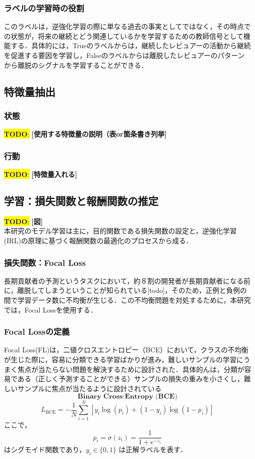 \documentclass[submit,techrep,noauthor]{ipsj}
\newcommand{\todo}[1]{\colorbox{yellow}{{\bf TODO}:}{\color{red} {\textbf{[#1]}}}}
\begin{document}
\subsubsection{ラベルの学習時の役割}
このラベルは，逆強化学習の際に単なる過去の事実としてではなく，その時点での状態が，将来の継続とどう関連しているかを学習するための教師信号として機能する．具体的には，Trueのラベルからは，継続したレビュアーの活動から継続を促進する要因を学習し，Falseのラベルからは離脱したレビュアーのパターンから離脱のシグナルを学習することができる．

\subsection{特徴量抽出}
\subsubsection{状態}
\todo{使用する特徴量の説明（表or箇条書き列挙}
\subsubsection{行動}
\todo{特徴量入れる}

\subsection{学習：損失関数と報酬関数の推定}
\todo{図} \\
本研究のモデル学習は主に，目的関数である損失関数の設定と，逆強化学習(IRL)の原理に基づく報酬関数の最適化のプロセスから成る．
\subsubsection{損失関数：Focal Loss}
長期貢献者の予測というタスクにおいて，約８割の開発者が長期貢献者になる前に，離脱してしまうということが知られている[todo]，そのため，正例と負例の間で学習データ数に不均衡が生じる．この不均衡問題を対処するために，本研究では，Focal Lossを使用する．
\subsubsection{Focal Lossの定義}
Focal Loss(FL)は，二値クロスエントロピー（BCE）において，クラスの不均衡が生じた際に，容易に分類できる学習ばかりが進み，難しいサンプルの学習にうまく焦点が当たらない問題を解決するために設計された．具体的んは，分類が容易である（正しく予測することができる）サンプルの損失の重みを小さくし，難しいサンプルに焦点が当たるように設計されている
\[\textbf{Binary Cross-Entropy (BCE)}\]
\[
L_{\mathrm{BCE}} = - \frac{1}{N} \sum_{i=1}^{N} \left[ y_i\log(p_i) + (1 - y_i)\log(1 - p_i)\right]
\]
ここで，
\[p_i = \sigma(z_i) = \frac{1}{1 + e^{-z_i}}\]はシグモイド関数であり，\(y_i \in \{0,1\}\) は正解ラベルを表す．
\end{document}
